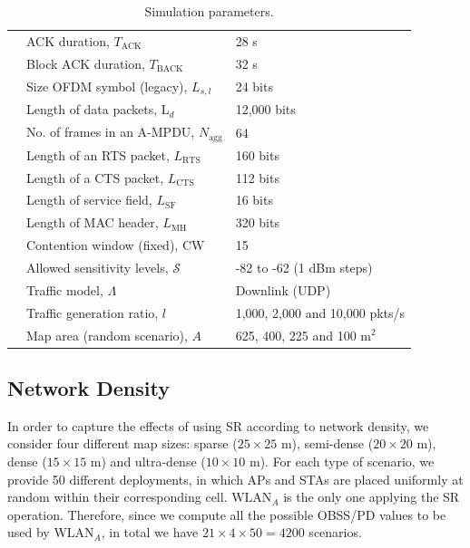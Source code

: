\documentclass[comsoc]{IEEEtran}
\begin{document}
\begin{table}[h]
{\begin{tabular}{c|l|l|}
				\multicolumn{1}{|c|}{} & ACK duration, $T_\text{ACK}$ & 28 \textmu s\\
				\cline{2-3} 
				\multicolumn{1}{|c|}{} & Block ACK duration, $T_\text{BACK}$ & 32 \textmu s \\
				\cline{2-3} 
				\multicolumn{1}{|c|}{} &  Size OFDM symbol (legacy), $L_{s,l}$ & 24 bits \\
				\cline{2-3} 
				\multicolumn{1}{|c|}{} & Length of data packets, $\text{L}_{d}$ & 12,000 bits \\
				\cline{2-3} 
				\multicolumn{1}{|c|}{} & No. of frames in an A-MPDU, $N_{\text{agg}}$ & 64 \\
				\cline{2-3} 
				\multicolumn{1}{|c|}{} & Length of an RTS packet, $L_\text{RTS}$ & 160 bits \\
				\cline{2-3} 
				\multicolumn{1}{|c|}{} & Length of a CTS packet, $L_\text{CTS}$ & 112 bits \\
				\cline{2-3} 
				\multicolumn{1}{|c|}{} & Length of service field, $L_\text{SF}$ & 16 bits  \\
				\cline{2-3} 
				\multicolumn{1}{|c|}{} & Length of MAC header, $L_\text{MH}$ & 320 bits \\
				\cline{2-3} 
				\multicolumn{1}{|c|}{} & Contention window (fixed), $\text{CW}$ & 15 \\
				\cline{2-3} 
				\multicolumn{1}{|c|}{} & Allowed sensitivity levels, $\mathcal{S}$ & -82 to -62 (1 dBm steps) \\
				\hline
		    	\multicolumn{1}{|c|}{\multirow{2}{*}{\centering\rotatebox[origin=c]{90}{Misc.  }}} & Traffic model, $\Lambda$ & Downlink (UDP)\\
				\cline{2-3} 
				\multicolumn{1}{|c|}{} & Traffic generation ratio, $l$ & 1,000, 2,000 and 10,000 pkts/s\\ 
				\cline{2-3} 
				\multicolumn{1}{|c|}{} & Map area (random scenario), $A$ & 625, 400, 225 and 100 m$^2$\\
				\hline
		\end{tabular}}
		\caption{Simulation parameters.}
		\label{table:parameters}
	\end{table}
	
	\subsection{Network Density}
	\label{section:random_scenarios_density}
    In order to capture the effects of using SR according to network density, we consider four different map sizes: sparse ($25\times25$ m), semi-dense ($20\times20$ m), dense ($15\times15$ m) and ultra-dense ($10\times10$ m). For each type of scenario, we provide 50 different deployments, in which APs and STAs are placed uniformly at random within their corresponding cell. $\text{WLAN}_A$ is the only one applying the SR operation. Therefore, since we compute all the possible OBSS/PD values to be used by $\text{WLAN}_A$, in total we have $21\times4\times50 = 4200$ scenarios.
	
\end{document}
